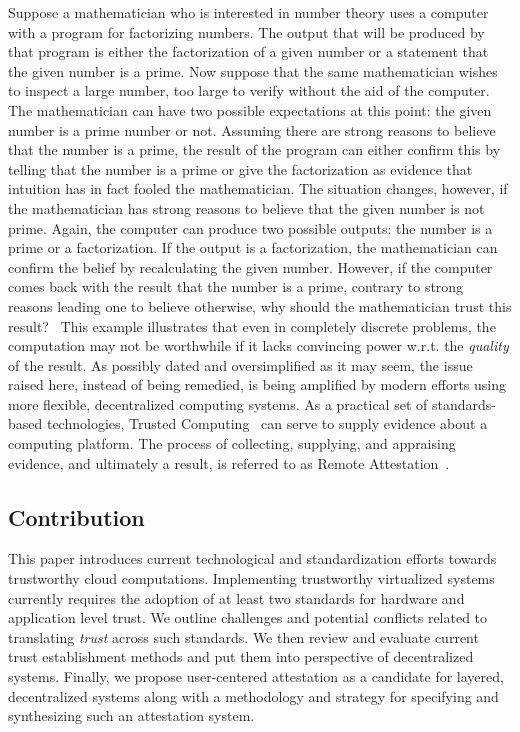 Suppose a mathematician who is interested in number theory uses a computer with a program for factorizing numbers. The output that will be produced by that program is either the factorization of a given number or a statement that the given number is a prime. Now suppose that the same mathematician wishes to inspect a large number, too large to verify without the aid of the computer. The mathematician can have two possible expectations at this point: the given number is a prime number or not. Assuming there are strong reasons to believe that the number is a prime, the result of the program can either confirm this by telling that the number is a prime or give the factorization as evidence that intuition has in fact fooled the mathematician. The situation changes, however, if the mathematician has strong reasons to believe that the given number is not prime. Again, the computer can produce two possible outputs: the number is a prime or a factorization. If the output is a factorization, the mathematician can confirm the belief by recalculating the given number. However, if the computer comes back with the result that the number is a prime, contrary to strong reasons leading one to believe otherwise, why should the mathematician trust this result?~\cite{Dijkstra1979} This example illustrates that even in completely discrete problems, the computation may not be worthwhile if it lacks convincing power w.r.t. the \emph{quality} of the result. As possibly dated and oversimplified as it may seem, the issue raised here, instead of being remedied, is being amplified by modern efforts using more flexible, decentralized computing systems. As a practical set of standards-based technologies, Trusted Computing~\cite{ISOTPM} can serve to supply evidence about a computing platform. The process of collecting, supplying, and appraising evidence, and ultimately a result, is referred to as Remote Attestation~\cite{RA,DAA,lauer2016}. 

\subsection{Contribution}
This paper introduces current technological and standardization efforts towards trustworthy cloud computations. Implementing trustworthy virtualized systems currently requires the adoption of at least two standards for hardware and application level trust. We outline challenges and potential conflicts related to translating \emph{trust} across such standards. We then review and evaluate current trust establishment methods and put them into perspective of decentralized systems. Finally, we propose user-centered attestation as a candidate for layered, decentralized systems along with a methodology and strategy for specifying and synthesizing such an attestation system.
